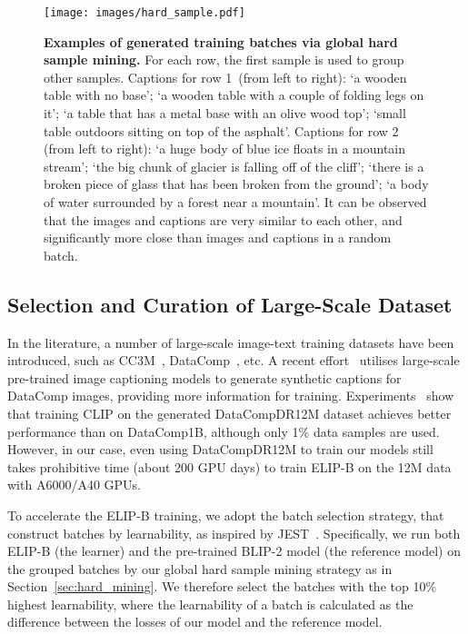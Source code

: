 \begin{figure}[t]
	\centering
\texttt{[image: images/hard\_sample.pdf]}
\vspace{-5mm}
\caption{
\textbf{Examples of generated training batches via global hard sample mining.} 
For each row, the first sample is used to group other samples. 
Captions for row 1~(from left to right): `a wooden table with no base'; `a wooden table with a couple of folding legs on it'; 
`a table that has a metal base with an olive wood top'; 
`small table outdoors sitting on top of the asphalt'. 
Captions for row 2 (from left to right): 
`a huge body of blue ice floats in a mountain stream'; 
`the big chunk of glacier is falling off of the cliff'; 
`there is a broken piece of glass that has been broken from the ground'; `a body of water surrounded by a forest near a mountain'. 
It can be observed that the images and captions are very similar to each other, and significantly more close than images and captions in a random batch. 
} 
\vspace{-3mm}
\label{fig:hard_sample}
\end{figure}

\subsection{Selection and Curation of Large-Scale Dataset}
\label{sec:large_training_data}

In the literature, a number of large-scale image-text training datasets have been introduced, such as CC3M~\cite{sharma2018conceptual}, DataComp~\cite{gadre2024datacomp}, etc. 
A recent effort~\cite{vasu2024mobileclip} utilises large-scale pre-trained image captioning models to generate synthetic captions for DataComp images, providing more information for training. 
Experiments~\cite{vasu2024mobileclip} show that training CLIP on the generated DataCompDR12M dataset achieves better performance than on DataComp1B, although only 1\% data samples are used. However, in our case, even using DataCompDR12M to train our models still takes prohibitive time (about 200 GPU days) to train ELIP-B on the 12M data with A6000/A40 GPUs. 


To accelerate the ELIP-B training, we adopt the batch selection strategy,
that construct batches by learnability, as inspired by JEST~\cite{evans2024data}. Specifically, we run both ELIP-B (the learner) and the pre-trained BLIP-2 model (the reference model) on the grouped batches by our global hard sample mining strategy as in Section~\ref{sec:hard_mining}. We therefore select the batches with the top 10\% highest learnability, where the learnability of a batch is calculated as the difference between the losses of our model and the reference model.


